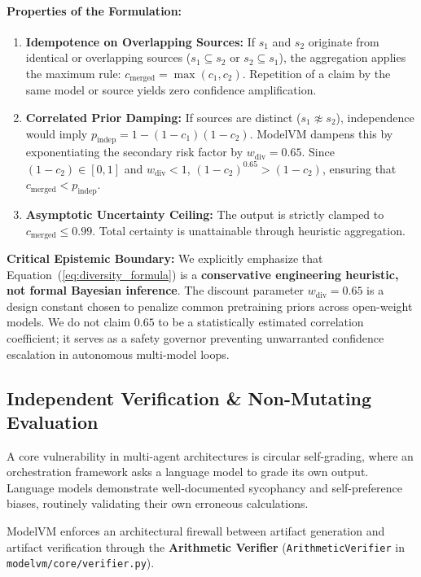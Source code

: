 \paragraph{Properties of the Formulation:}
\begin{enumerate}
    \item \textbf{Idempotence on Overlapping Sources:} If $s_1$ and $s_2$ originate from identical or overlapping sources ($s_1 \subseteq s_2$ or $s_2 \subseteq s_1$), the aggregation applies the maximum rule: $c_{\text{merged}} = \max(c_1, c_2)$. Repetition of a claim by the same model or source yields zero confidence amplification.
    \item \textbf{Correlated Prior Damping:} If sources are distinct ($s_1 \not\approx s_2$), independence would imply $p_{\text{indep}} = 1 - (1 - c_1)(1 - c_2)$. ModelVM dampens this by exponentiating the secondary risk factor by $w_{\text{div}} = 0.65$. Since $(1 - c_2) \in [0, 1]$ and $w_{\text{div}} < 1$, $(1 - c_2)^{0.65} > (1 - c_2)$, ensuring that $c_{\text{merged}} < p_{\text{indep}}$.
    \item \textbf{Asymptotic Uncertainty Ceiling:} The output is strictly clamped to $c_{\text{merged}} \le 0.99$. Total certainty is unattainable through heuristic aggregation.
\end{enumerate}

\noindent\textbf{Critical Epistemic Boundary:}
We explicitly emphasize that Equation~(\ref{eq:diversity_formula}) is a \textbf{conservative engineering heuristic, not formal Bayesian inference}. The discount parameter $w_{\text{div}} = 0.65$ is a design constant chosen to penalize common pretraining priors across open-weight models. We do not claim $0.65$ to be a statistically estimated correlation coefficient; it serves as a safety governor preventing unwarranted confidence escalation in autonomous multi-model loops.

\subsection{Independent Verification \& Non-Mutating Evaluation}
\label{sec:independent_verification}

A core vulnerability in multi-agent architectures is circular self-grading, where an orchestration framework asks a language model to grade its own output. Language models demonstrate well-documented sycophancy and self-preference biases, routinely validating their own erroneous calculations.

ModelVM enforces an architectural firewall between artifact generation and artifact verification through the \textbf{Arithmetic Verifier} (\texttt{ArithmeticVerifier} in \texttt{modelvm/core/verifier.py}).

